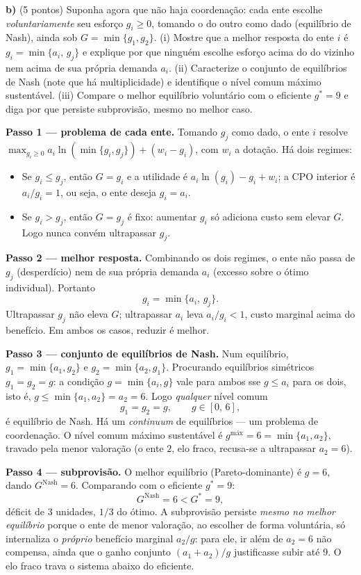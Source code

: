 \textbf{b)} (5 pontos) Suponha agora que não haja coordenação: cada ente escolhe \emph{voluntariamente} seu esforço $g_i\ge 0$, tomando o do outro como dado (equilíbrio de Nash), ainda sob $G=\min\{g_1,g_2\}$. (i) Mostre que a melhor resposta do ente $i$ é $g_i=\min\{a_i,\,g_j\}$ e explique por que ninguém escolhe esforço acima do do vizinho nem acima de sua própria demanda $a_i$. (ii) Caracterize o conjunto de equilíbrios de Nash (note que há multiplicidade) e identifique o nível comum máximo sustentável. (iii) Compare o melhor equilíbrio voluntário com o eficiente $g^{*}=9$ e diga por que persiste subprovisão, mesmo no melhor caso.
\resolucaobox{7.2cm}
\begin{solucao}
\textbf{Passo 1 --- problema de cada ente.} Tomando $g_j$ como dado, o ente $i$ resolve $\max_{g_i\ge 0} a_i\ln(\min\{g_i,g_j\})+(w_i-g_i)$, com $w_i$ a dotação. Há dois regimes:
\begin{itemize}
\item Se $g_i\le g_j$, então $G=g_i$ e a utilidade é $a_i\ln(g_i)-g_i+w_i$; a CPO interior é $a_i/g_i=1$, ou seja, o ente deseja $g_i=a_i$.
\item Se $g_i> g_j$, então $G=g_j$ é fixo: aumentar $g_i$ só adiciona custo sem elevar $G$. Logo nunca convém ultrapassar $g_j$.
\end{itemize}

\textbf{Passo 2 --- melhor resposta.} Combinando os dois regimes, o ente não passa de $g_j$ (desperdício) nem de sua própria demanda $a_i$ (excesso sobre o ótimo individual). Portanto
\[
g_i=\min\{a_i,\,g_j\}.
\]
Ultrapassar $g_j$ não eleva $G$; ultrapassar $a_i$ leva $a_i/g_i<1$, custo marginal acima do benefício. Em ambos os casos, reduzir é melhor.

\textbf{Passo 3 --- conjunto de equilíbrios de Nash.} Num equilíbrio, $g_1=\min\{a_1,g_2\}$ e $g_2=\min\{a_2,g_1\}$. Procurando equilíbrios simétricos $g_1=g_2=g$: a condição $g=\min\{a_i,g\}$ vale para ambos sse $g\le a_i$ para os dois, isto é, $g\le\min\{a_1,a_2\}=a_2=6$. Logo \emph{qualquer} nível comum
\[
g_1=g_2=g,\qquad g\in[0,\,6],
\]
é equilíbrio de Nash. Há um \emph{continuum} de equilíbrios --- um problema de coordenação. O nível comum máximo sustentável é $g^{\text{máx}}=6=\min\{a_1,a_2\}$, travado pela menor valoração (o ente $2$, elo fraco, recusa-se a ultrapassar $a_2=6$).

\textbf{Passo 4 --- subprovisão.} O melhor equilíbrio (Pareto-dominante) é $g=6$, dando $G^{\text{Nash}}=6$. Comparando com o eficiente $g^{*}=9$:
\[
G^{\text{Nash}}=6<G^{*}=9,
\]
déficit de $3$ unidades, $1/3$ do ótimo. A subprovisão persiste \emph{mesmo no melhor equilíbrio} porque o ente de menor valoração, ao escolher de forma voluntária, só internaliza o \emph{próprio} benefício marginal $a_2/g$: para ele, ir além de $a_2=6$ não compensa, ainda que o ganho conjunto $(a_1+a_2)/g$ justificasse subir até $9$. O elo fraco trava o sistema abaixo do eficiente.


\end{solucao}
